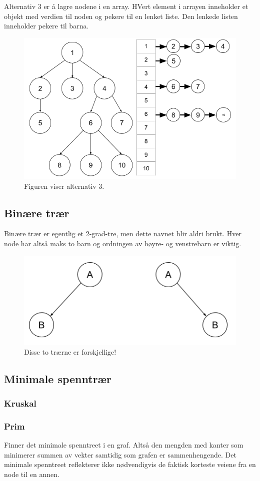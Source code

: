 \noindent Alternativ 3 er å lagre nodene i en array. HVert element i arrayen inneholder et objekt med verdien til noden og pekere til en lenket liste. Den lenkede listen inneholder pekere til barna.

\begin{figure}[H]
\includegraphics[scale=0.6]{images/alernativ3}
\centering %
\caption{Figuren viser alternativ 3.}
\label{fig:alternativ3}
\end{figure}

\subsection{Binære trær}
Binære trær er egentlig et 2-grad-tre, men dette navnet blir aldri brukt. Hver node har altså maks to barn og ordningen av høyre- og venstrebarn er viktig.

\begin{figure}[H]
\includegraphics[scale=0.6]{images/binaeretraer}
\centering %
\caption{Disse to trærne er forskjellige!}
\label{fig:binaeretraer}
\end{figure}

\subsection{Minimale spenntrær}
\subsubsection{Kruskal}
\subsubsection{Prim}
Finner det minimale spenntreet i en graf. Altså den mengden med kanter som minimerer summen av vekter samtidig som grafen er sammenhengende. Det minimale spenntreet reflekterer ikke nødvendigvis de faktisk korteste veiene fra en node til en annen.
